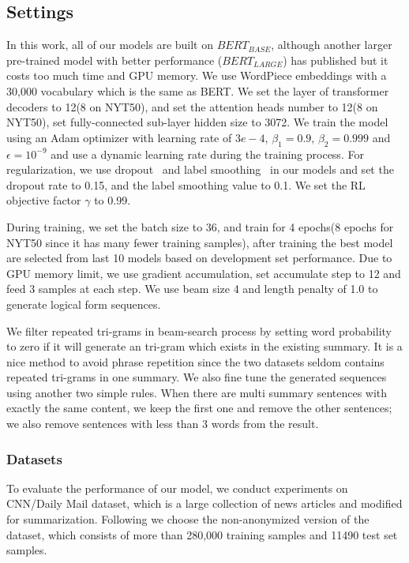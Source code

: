 \documentclass{article}
\begin{document}
\subsection{Settings}

In this work, all of our models are built on $BERT_{BASE}$, although another larger pre-trained model with better performance ($BERT_{LARGE}$) has published but it costs too much time and GPU memory. We use WordPiece embeddings with a 30,000 vocabulary which is the same as BERT. We set the layer of transformer decoders to 12(8 on NYT50), and set the attention heads number to 12(8 on NYT50), set fully-connected sub-layer hidden size to 3072. We train the model using an Adam optimizer with learning rate of $3e-4$, $\beta_1=0.9$, $\beta_2=0.999$ and $\epsilon=10^{-9}$ and use a dynamic learning rate during the training process. For regularization, we use dropout~\cite{Srivastava2014Dropout} and label smoothing~\cite{Szegedy2015Rethinking} in our models and set the dropout rate to 0.15, and the label smoothing value to 0.1. We set the RL objective factor $\gamma$ to 0.99.

During training, we set the batch size to 36, and train for 4 epochs(8 epochs for NYT50 since it has many fewer training samples), after training the best model are selected from last 10 models based on development set performance. Due to GPU memory limit, we use gradient accumulation, set accumulate step to 12 and feed 3 samples at each step. We use beam size 4 and length penalty of 1.0 to generate logical form sequences.

We filter repeated tri-grams in beam-search process by setting word probability to zero if it will generate an tri-gram which exists in the existing summary. It is a nice method to avoid phrase repetition since the two datasets seldom contains repeated tri-grams in one summary. We also fine tune the generated sequences using another two simple rules. When there are multi summary sentences with exactly the same content, we keep the first one and remove the other sentences; we also remove sentences with less than 3 words from the result.

\subsubsection{Datasets}
To evaluate the performance of our model, we conduct experiments on CNN/Daily Mail dataset, which is a large collection of news articles and modified for summarization. Following \cite{See2017} we choose the non-anonymized version of the dataset, which consists of more than 280,000 training samples and 11490 test set samples. 
\end{document}
